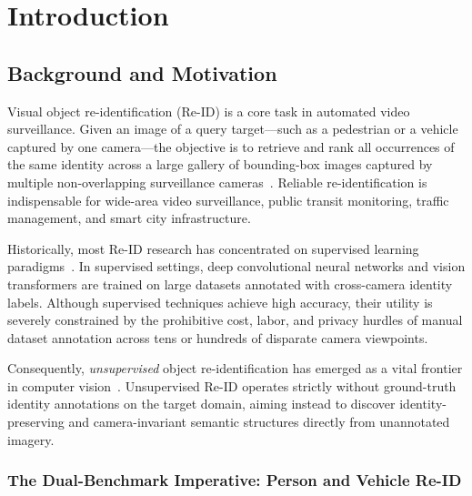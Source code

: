 \chapter{Introduction}
\label{chap:intro}

\section{Background and Motivation}
\label{sec:intro_bg}

Visual object re-identification (Re-ID) is a core task in automated video surveillance. Given an image of a query target---such as a pedestrian or a vehicle captured by one camera---the objective is to retrieve and rank all occurrences of the same identity across a large gallery of bounding-box images captured by multiple non-overlapping surveillance cameras~\cite{zheng2015scalable}. Reliable re-identification is indispensable for wide-area video surveillance, public transit monitoring, traffic management, and smart city infrastructure.

Historically, most Re-ID research has concentrated on supervised learning paradigms~\cite{he2016deep,hermans2017triplet,lin2019bot}. In supervised settings, deep convolutional neural networks and vision transformers are trained on large datasets annotated with cross-camera identity labels. Although supervised techniques achieve high accuracy, their utility is severely constrained by the prohibitive cost, labor, and privacy hurdles of manual dataset annotation across tens or hundreds of disparate camera viewpoints.

Consequently, \textit{unsupervised} object re-identification has emerged as a vital frontier in computer vision~\cite{ge2020selfpaced,chen2021ice,wang2021cap,cho2022pplr}. Unsupervised Re-ID operates strictly without ground-truth identity annotations on the target domain, aiming instead to discover identity-preserving and camera-invariant semantic structures directly from unannotated imagery.

\subsection{The Dual-Benchmark Imperative: Person and Vehicle Re-ID}
\label{subsec:dual_benchmark}

